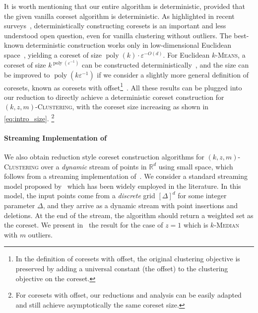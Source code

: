 \documentclass[letterpaper,11pt]{article}
\theoremstyle{plain}
\theoremstyle{definition}
\theoremstyle{remark}
\DeclareMathOperator{\poly}{poly}
\newcommand{\eps}{\varepsilon}
\newcommand{\ProblemName}[1]{\textsc{#1}}
\newcommand{\kMedian}{\ProblemName{$k$-Median}\xspace}
\newcommand{\kMeans}{\ProblemName{$k$-Means}\xspace}
\newcommand{\kzmC}{\ProblemName{$(k,z,m)$-Clustering}\xspace}
\begin{document}
It is worth mentioning that our entire algorithm is deterministic, provided that the given vanilla coreset algorithm is deterministic.
As highlighted in recent surveys~\cite{DBLP:journals/ki/MunteanuS18, DBLP:journals/widm/Feldman20},
deterministically constructing coresets is an important and less understood open question, even for vanilla clustering without outliers.
The best-known deterministic construction works only in low-dimensional Euclidean space~\cite{DBLP:journals/dcg/Har-PeledK07}, yielding a coreset of size $\poly(k) \cdot \eps^{-O(d)}$.
For Euclidean \kMeans, a coreset of size $k^{\poly(\eps^{-1})}$ can be constructed deterministically~\cite{FeldmanSS20Turning}, and the size 
can be improved to $\poly(k\eps^{-1})$ if we consider a slightly more general definition of coresets, known as coresets with offset\footnote{In the definition of coresets with offset, the original clustering objective is preserved by adding a universal constant (the offset) to the clustering objective on the coreset.}~\cite{Cohen-addad23Deterministic}. 
All these results can be plugged into our reduction to directly achieve a deterministic coreset construction for \kzmC, with the coreset size increasing as shown in \eqref{eq:intro_size}.
\footnote{For coresets with offset, our reductions and analysis can be easily adapted and still achieve asymptotically the same coreset size.}



















\paragraph{Streaming Implementation of~}

We also obtain reduction style coreset construction algorithms for \kzmC over a \emph{dynamic} stream of points in $\mathbb{R}^d$ using small space, which follows from a streaming implementation of~.
We consider a standard streaming model proposed by~\cite{DBLP:conf/stoc/Indyk04}
which has been widely employed in the literature.
In this model, the input points come from a \emph{discrete} grid $[\Delta]^d$ for some integer parameter $\Delta$,
and they arrive as a dynamic stream with point insertions and deletions.
At the end of the stream, the algorithm should return a weighted set as the coreset.
We present in~ the result
for the case of $z = 1$ which is \kMedian with $m$ outliers.
\end{document}

